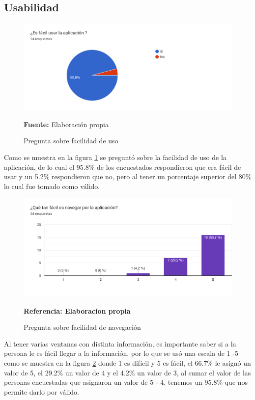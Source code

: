 \documentclass[12pt,twocolumn,a4paper]{article}
\begin{document}
\subsection{Usabilidad}

\begin{figure}
	\centering
	\includegraphics[scale=0.5]{Encuesta1.png}
	\caption{Pregunta sobre facilidad de uso} \textbf{Fuente:} Elaboración propia 
	\label{Encuesta1}
\end{figure}

Como se muestra en la figura \ref{Encuesta1} se preguntó sobre la facilidad de uso de la aplicación, de lo cual el 95.8\% de los encuestados respondieron que era fácil de usar y un 5.2\% respondieron que no, pero al tener un porcentaje superior del 80\% lo cual fue tomado como válido.

\begin{figure}
	\centering
	\includegraphics[scale=0.3]{Encuesta2.png}
	\caption{Pregunta sobre facilidad de navegación} \textbf{Referencia: Elaboracion propia} 
	\label{Encuesta2}
\end{figure}

Al tener varias ventanas con distinta información, es importante saber si a la persona le es fácil llegar a la información, por lo que se usó una escala de 1 -5 como se muestra en la figura \ref{Encuesta2}  donde 1 es difícil y 5 es fácil, el 66.7\% le asignó un valor de 5, el 29.2\% un valor de 4 y el 4.2\% un valor de 3, al sumar el valor de las personas encuestadas que asignaron un valor de 5 - 4, tenemos un 95.8\% que nos permite darlo por válido. 
\end{document}
